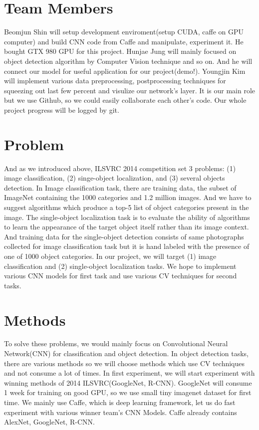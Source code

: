 \documentclass[10pt,twocolumn,letterpaper]{article}
\begin{document}
\section{Team Members}

Beomjun Shin will setup development enviroment(setup CUDA, caffe on GPU computer) and build CNN code from Caffe and manipulate, experiment it.
He bought GTX 980 GPU for this project.
Hunjae Jung will mainly focused on object detection algorithm by Computer Vision technique and so on.
And he will connect our model for useful application for our project(demo!).
Youngjin Kim will implement various data preprocessing, postprocessing techniques for squeezing out last few percent and visulize our network's layer.
It is our main role but we use Github, so we could easily collaborate each other's code.
Our whole project progress will be logged by git.

\section{Problem}

And as we introduced above, ILSVRC 2014 competition set 3 problems: (1) image classification, (2) singe-object localization, and (3) several objects detection.
In Image classification task, there are training data, the subset of ImageNet containing the 1000 categories and 1.2 million images.
And we have to suggest algorithms which produce a top-5 list of object categories present in the image.
The single-object localization task is to evaluate the ability of algorithms to learn the appearance of the target object itself rather than its image context.
And training data for the single-object detection consists of same photographs collected for image classification task but it is hand labeled with the presence of one of 1000 object categories.
In our project, we will target (1) image classification and (2) single-object localization tasks.
We hope to implement various CNN models for first task and use various CV techniques for second tasks.

\section{Methods}

To solve these problems, we would mainly focus on Convolutional Neural Network(CNN) for classification and object detection.
In object detection tasks, there are various methods so we will choose methods which use CV techniques and not consume a lot of times.
In first experiment, we will start experiment with winning methods of 2014 ILSVRC(GoogleNet, R-CNN).
GoogleNet will consume 1 week for training on good GPU, so we use small tiny imagenet dataset for first time.
We mainly use Caffe, which is deep learning framework, let us do fast experiment with various winner team's CNN Models.
Caffe already contains AlexNet, GoogleNet, R-CNN.
\end{document}
